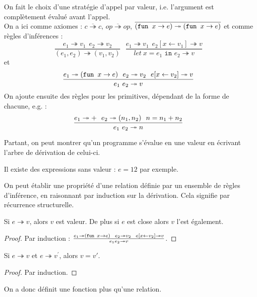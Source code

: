 \documentclass{cours}
\begin{document}
On fait le choix d'une stratégie d'appel par valeur, i.e. l'argument est complètement évalué avant l'appel. \\
On a ici comme axiomes : $\overline{c \twoheadrightarrow c}$, $\overline{op \twoheadrightarrow op}$, $\overline{(\texttt{fun } x \rightarrow e) \twoheadrightarrow (\texttt{fun } x \rightarrow e)}$
et comme règles d'inférences :
\[
    \frac{e_{1} \twoheadrightarrow v_{1} \ \ e_{2} \twoheadrightarrow v_{2}}{(e_{1}, e_{2}) \twoheadrightarrow (v_{1}, v_{2})} \ \ \ \frac{e_{1} \twoheadrightarrow v_{1} \ \ e_{2}[x \leftarrow v_{1}] \twoheadrightarrow v}{let\ x  = e_{1} \texttt{ in } e_{2} \twoheadrightarrow v}
\]
et
\[
    \frac{e_{1}\twoheadrightarrow(\texttt{fun } x \rightarrow e)\ \ e_{2} \twoheadrightarrow v_{2} \ \ e[x \leftarrow v_{2}] \twoheadrightarrow v}{e_{1}\ e_{2} \twoheadrightarrow v}
\]
On ajoute ensuite des règles pour les primitives, dépendant de la forme de chacune, e.g. :
\[
    \frac{e_{1} \twoheadrightarrow + \ \ e_{2} \twoheadrightarrow (n_{1}, n_{2})\ \ n = n_{1} + n_{2}}{e_{1}\ e_{2} \twoheadrightarrow n}
\]

Partant, on peut montrer qu'un programme s'évalue en une valeur en écrivant l'arbre de dérivation de celui-ci. \\
\begin{remark}
    Il existe des expressions sans valeur : $e = 1 2$ par exemple.
\end{remark}

On peut établir une propriété d'une relation définie par un ensemble de règles d'inférence, en raisonnant par induction sur la dérivation. Cela signifie par récurrence structurelle.
\begin{proposition}
    Si $e\twoheadrightarrow v$, alors $v$ est valeur. De plus si $e$ est close alors $v$ l'est également.
\end{proposition}
\begin{proof}
    Par induction : $\frac{e_{1} \twoheadrightarrow (\fun{x}{e}) \ \ e_{2} \twoheadrightarrow v_{2} \ \ e[x \leftarrow v_{2}] \twoheadrightarrow v}{e_{1} e_{2} \twoheadrightarrow v}$.
\end{proof}
\begin{proposition}
    Si $e \twoheadrightarrow v$ et $e \twoheadrightarrow v^{'}$, alors $v = v'$.
\end{proposition}
\begin{proof}
    Par induction.
\end{proof}
\begin{remark}
    On a donc définit une fonction plus qu'une relation.
\end{remark}
\end{document}
